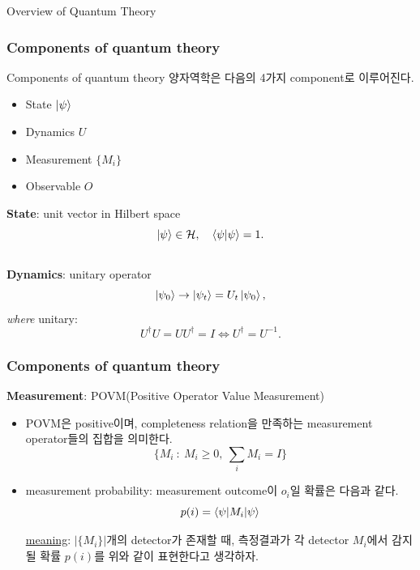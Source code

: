\documentclass[9pt]{beamer}
\begin{document}
\begin{section}{Overview of Quantum Theory}
        \begin{frame}
            \frametitle{Components of quantum theory}
            \begin{block}{Components of quantum theory}
                양자역학은 다음의 4가지 component로 이루어진다.
                \begin{itemize}
                    \item State $\ket{\psi}$
                    \item Dynamics $U$
                    \item Measurement $\{M_i\}$
                    \item Observable $O$
                \end{itemize}
            \end{block}
            \vspace{0.2cm}
            \textbf{State}: unit vector in Hilbert space 
            $$ \ket{\psi} \in \mathcal H,\quad \braket{\psi|\psi} = 1.$$
            \vspace{0.2cm}
            \\\textbf{Dynamics}: unitary operator
            $$\ket{\psi_0} \rightarrow \ket{\psi_t} = U_t\ket{\psi_0},$$
            \textit{where} unitary:
            $$ U^\dagger U = UU^\dagger = I \Leftrightarrow U^\dagger = U^{-1}.$$
        \end{frame}

        \begin{frame}
            \frametitle{Components of quantum theory}
            \textbf{Measurement}: POVM(Positive Operator Value Measurement)
            \vspace{0.3cm}
            \begin{itemize}
                \item POVM은 positive이며, completeness relation을 만족하는 measurement operator들의 집합을 의미한다. 
                $$\Big\{M_i \ : \ M_i \ge 0,\ \sum_i M_i = I \Big\}$$
                \item measurement probability: measurement outcome이 $o_i$일 확률은 다음과 같다. 
                $$ p(i) = \braket{\psi | M_i | \psi}$$
                \vspace{0.1cm}

                \checkmark \underline{meaning}: $|\{M_i\}|$개의 detector가 존재할 때, 측정결과가 각 detector $M_i$에서 감지될 확률 $p(i)$를 위와 같이 표현한다고 생각하자.
            \end{itemize}
        \end{frame}



\end{section}
\end{document}
